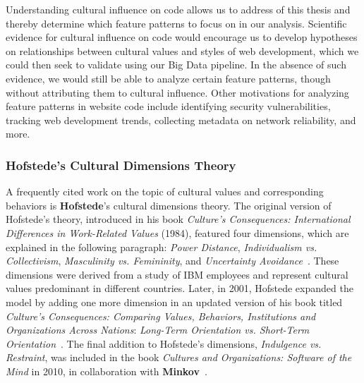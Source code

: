 Understanding cultural influence on code allows us to address  of this thesis and thereby determine which feature patterns to focus on in our analysis.
Scientific evidence for cultural influence on code would encourage us to develop hypotheses on relationships between cultural values and styles of web development, which we could then seek to validate using our Big Data pipeline.
In the absence of such evidence, we would still be able to analyze certain feature patterns, though without attributing them to cultural influence.
Other motivations for analyzing feature patterns in website code include identifying security vulnerabilities, tracking web development trends, collecting metadata on network reliability, and more.

\subsubsection{Hofstede's Cultural Dimensions Theory}
\label{sec:related-work-culture-hofstede}

A frequently cited work on the topic of cultural values and corresponding behaviors is \textbf{Hofstede}'s cultural dimensions theory.
The original version of Hofstede's theory, introduced in his book \textit{Culture's Consequences: International Differences in Work-Related Values} (1984), featured four dimensions, which are explained in the following paragraph: \textit{Power Distance}, \textit{Individualism vs. Collectivism}, \textit{Masculinity vs. Femininity}, and \textit{Uncertainty Avoidance}~\cite{Hofstede1984}.
These dimensions were derived from a study of IBM employees and represent cultural values predominant in different countries.
Later, in 2001, Hofstede expanded the model by adding one more dimension in an updated version of his book titled \textit{Culture's Consequences: Comparing Values, Behaviors, Institutions and Organizations Across Nations}: \textit{Long-Term Orientation vs. Short-Term Orientation}~\cite{Hofstede2001}.
The final addition to Hofstede's dimensions, \textit{Indulgence vs. Restraint}, was included in the book \textit{Cultures and Organizations: Software of the Mind} in 2010, in collaboration with \textbf{Minkov}~\cite{Hofstede2010}.

